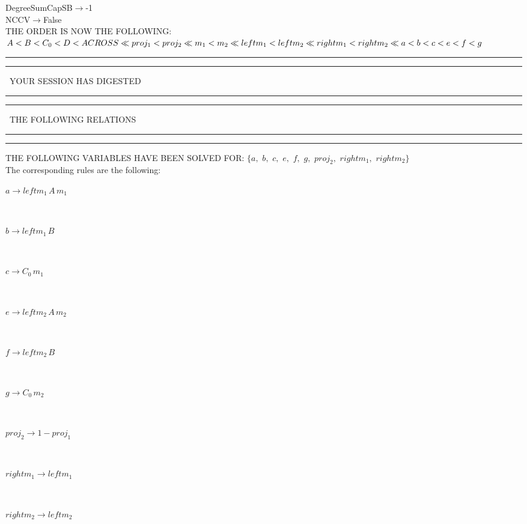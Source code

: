 \documentclass[rep10,leqno]{report}
\begin{document}
DegreeSumCapSB$\rightarrow $-1\\
NCCV$\rightarrow $False\\
THE ORDER IS NOW THE FOLLOWING:\hfil\break
$
A<B<C_{0}<D<ACROSS\ll
proj_{1}<proj_{2}\ll
m_{1}<m_{2}\ll
leftm_{1}<leftm_{2}\ll
rightm_{1}<rightm_{2}\ll
a<b<c<e<f<g\\
$
\rule[2pt]{6in}{4pt}\hfil\break
\rule[2pt]{1.879in}{4pt}
\ YOUR SESSION HAS DIGESTED\ 
\rule[2pt]{1.879in}{4pt}\hfil\break
\rule[2pt]{1.923in}{4pt}
\ THE FOLLOWING RELATIONS\ 
\rule[2pt]{1.923in}{4pt}\hfil\break
\rule[2pt]{6in}{4pt}\hfil\break
THE FOLLOWING VARIABLES HAVE BEEN SOLVED FOR:\hfil\break
$\{a,
$ $
b,
$ $
c,
$ $
e,
$ $
f,
$ $
g,
$ $
proj_{2},
$ $
rightm_{1},
$ $
rightm_{2}\}$
\smallskip\\
The corresponding rules are the following:\smallskip\\
\begin{minipage}{6in}
$
a\rightarrow leftm_{1}\,
 A\,
 m_{1}
$
\end{minipage}\medskip\\
\begin{minipage}{6in}
$
b\rightarrow leftm_{1}\,
 B
$
\end{minipage}\medskip\\
\begin{minipage}{6in}
$
c\rightarrow C_{0}\,
 m_{1}
$
\end{minipage}\medskip\\
\begin{minipage}{6in}
$
e\rightarrow leftm_{2}\,
 A\,
 m_{2}
$
\end{minipage}\medskip\\
\begin{minipage}{6in}
$
f\rightarrow leftm_{2}\,
 B
$
\end{minipage}\medskip\\
\begin{minipage}{6in}
$
g\rightarrow C_{0}\,
 m_{2}
$
\end{minipage}\medskip\\
\begin{minipage}{6in}
$
proj_{2}\rightarrow 1 - proj_{1}
$
\end{minipage}\medskip\\
\begin{minipage}{6in}
$
rightm_{1}\rightarrow leftm_{1}
$
\end{minipage}\medskip\\
\begin{minipage}{6in}
$
rightm_{2}\rightarrow leftm_{2}
$
\end{minipage}\medskip\\
\end{document}
